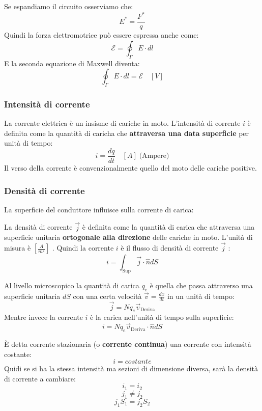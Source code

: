 \documentclass[a4paper]{article}
\begin{document}
\vspace{1em}
\noindent
Se espandiamo il circuito osserviamo che:
\label{30-04-D6}
\[
  E^* = \frac{F^*}{q}
\] 
Quindi la forza elettromotrice può essere espressa anche come:
\[
  \mathcal{E} = \oint_{\Gamma} E \cdot dl
\] 
E la seconda equazione di Maxwell diventa:
\[
  \oint_{\Gamma} E \cdot dl = \mathcal{E} \quad \left[ V \right]
\]

\subsubsection{Intensità di corrente}
La corrente elettrica è un insisme di cariche in moto. L'intensità di corrente \( i \) 
è definita come la quantità di caricha che \textbf{attraversa una data superficie} per
unità di tempo:
\[
  i = \frac{dq}{dt} \quad \left[ A \right] \; \text{(Ampere)}
\] 
Il verso della corrente è convenzionalmente quello del moto delle cariche positive.
\label{30-04-D7}

\subsubsection{Densità di corrente}
\begin{example}
  La superficie del conduttore influisce sulla corrente di carica:
  \label{30-04-D8}
\end{example}
La densità di corrente \( \vec{j} \) è definita come la quantità di carica che attraversa
una superficie unitaria \textbf{ortogonale alla direzione} delle cariche in moto.
L'unità di misura è \( \left[ \frac{A}{m^2} \right] \) . Quindi la corrente \( i \)  è il flusso
di densità di corrente \( \vec{j} \) :
\[
  i = \int_{\text{Sup}} \vec{j} \cdot \hat{n} dS
\]

Al livello microscopico la quantità di carica \( q_e \)  è quella che passa attraverso una superficie
unitaria \( dS \) con una certa velocità \( \vec{v} = \frac{dx}{dt} \) in un unità di tempo:
\label{30-04-D9}
\[
  \vec{j} = N q_e \vec{v}_{\text{Deriva}}
\] 
Mentre invece la corrente \( i \) è la carica nell'unità di tempo sulla superficie:
\[
  i = N q_e \vec{v}_{\text{Deriva}} \cdot \hat{n} dS
\] 

\vspace{1em}
\noindent
È detta corrente stazionaria (o \textbf{corrente continua}) una corrente con intensità 
costante:
\[
   i = costante
\] 
\label{30-04-D10}
Quidi se si ha la stessa intensità ma sezioni di dimensione diversa, sarà la densità
di corrente a cambiare:
\[
  i_1 = i_2
\] 
\[
  j_1 \neq j_2
\] 
\[
  j_1 S_1 = j_2 S_2
\] 
\end{document}
